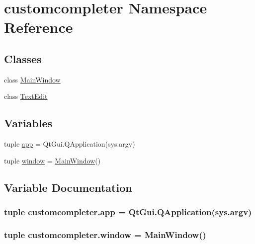 \hypertarget{namespacecustomcompleter}{}\section{customcompleter Namespace Reference}
\label{namespacecustomcompleter}
\subsection*{Classes}
\begin{DoxyCompactItemize}
\item 
class \hyperlink{classcustomcompleter_1_1MainWindow}{Main\+Window}
\item 
class \hyperlink{classcustomcompleter_1_1TextEdit}{Text\+Edit}
\end{DoxyCompactItemize}
\subsection*{Variables}
\begin{DoxyCompactItemize}
\item 
tuple \hyperlink{namespacecustomcompleter_acdfa67b513f38e8ab314ac9a884e93d7}{app} = Qt\+Gui.\+Q\+Application(sys.\+argv)
\item 
tuple \hyperlink{namespacecustomcompleter_afd2e0a8a4d8509641a0a7e5558ddf82d}{window} = \hyperlink{classcustomcompleter_1_1MainWindow}{Main\+Window}()
\end{DoxyCompactItemize}


\subsection{Variable Documentation}
\hypertarget{namespacecustomcompleter_acdfa67b513f38e8ab314ac9a884e93d7}{}
\subsubsection[{app}]{\setlength{\rightskip}{0pt plus 5cm}tuple customcompleter.\+app = Qt\+Gui.\+Q\+Application(sys.\+argv)}\label{namespacecustomcompleter_acdfa67b513f38e8ab314ac9a884e93d7}
\hypertarget{namespacecustomcompleter_afd2e0a8a4d8509641a0a7e5558ddf82d}{}
\subsubsection[{window}]{\setlength{\rightskip}{0pt plus 5cm}tuple customcompleter.\+window = {\bf Main\+Window}()}\label{namespacecustomcompleter_afd2e0a8a4d8509641a0a7e5558ddf82d}
